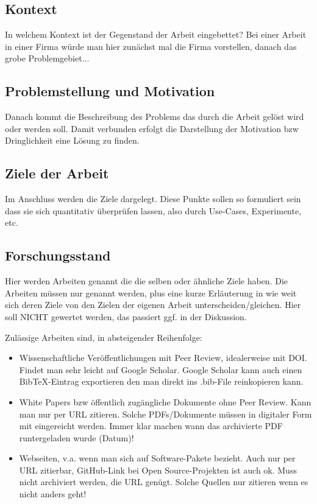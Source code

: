 \documentclass[12pt,oneside]{article}
\begin{document}
\subsection{Kontext}
In welchem Kontext ist der Gegenstand der Arbeit eingebettet? Bei einer Arbeit in einer Firma würde man hier zunächst mal die Firma vorstellen, danach das grobe Problemgebiet...
%
\subsection{Problemstellung und Motivation}
Danach kommt die Beschreibung des Problems das durch die Arbeit gelöst wird oder werden soll. Damit verbunden erfolgt die Darstellung der Motivation bzw Dringlichkeit eine Lösung zu finden. 
%
\subsection{Ziele der Arbeit}\label{sec:ziele}
Im Anschluss werden die Ziele dargelegt. Diese Punkte sollen so formuliert sein dass sie sich quantitativ überprüfen lassen, also durch Use-Cases, Experimente, etc.
%
\subsection{Forschungsstand}
\label{sec:relwork}
Hier werden Arbeiten genannt die die selben oder ähnliche Ziele haben. Die Arbeiten müssen nur genannt werden, plus eine kurze Erläuterung in wie weit sich deren Ziele von den Zielen der eigenen Arbeit unterscheiden/gleichen. Hier soll NICHT gewertet werden, das passiert ggf. in der Diskussion.

Zulässige Arbeiten sind, in absteigender Reihenfolge:
\begin{itemize}
\item Wissenschaftliche Veröffentlichungen mit Peer Review, idealerweise mit DOI. Findet man sehr leicht auf Google Scholar. Google Scholar kann auch einen BibTeX-Eintrag exportieren den man direkt ins .bib-File reinkopieren kann.
\item White Papers bzw öffentlich zugängliche Dokumente ohne Peer Review. Kann man nur per URL zitieren. Solche PDFs/Dokumente müssen in digitaler Form mit eingereicht werden. Immer klar machen wann das archivierte PDF runtergeladen wurde (Datum)!
\item Webseiten, v.a. wenn man sich auf Software-Pakete bezieht. Auch nur per URL zitierbar, GitHub-Link bei Open Source-Projekten ist auch ok. Muss nicht archiviert werden, die URL genügt. Solche Quellen nur zitieren wenn es nicht anders geht!
\end{itemize}
\end{document}
